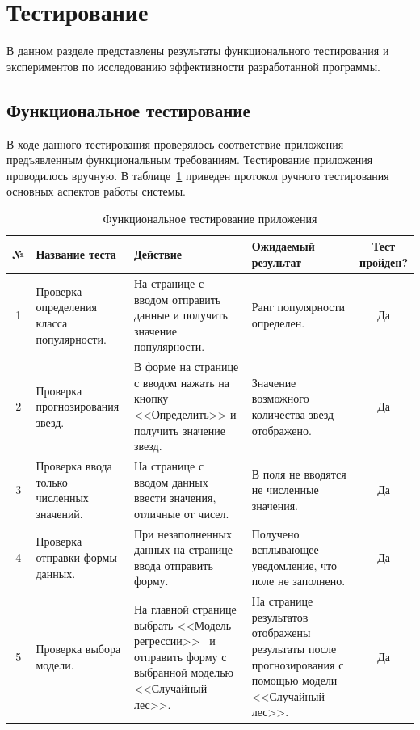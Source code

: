 \newpage
\section{Тестирование}
\label{sec:Testings}
В данном разделе представлены результаты функционального тестирования и экспериментов по исследованию эффективности разработанной программы.
\vspace{1.2em}

\subsection{Функциональное тестирование}

В ходе данного тестирования проверялось соответствие приложения
предъявленным функциональным требованиям. Тестирование приложения
проводилось вручную. В таблице~\ref{tab:тест} приведен протокол ручного тестирования основных аспектов работы системы.

\begin{table}[H]
    \caption{Функциональное тестирование приложения}
    \fontsize{12pt}{1em}\selectfont
    \vspace{1em}
    \begin{tabularx}{\linewidth}{|c|X|X|X|c|}
       \hline
        \textbf{№} & \textbf{Название теста} & \textbf{Действие} & \textbf{Ожидаемый результат} & \makecell{\textbf{Тест} \\ \textbf{пройден?}} \\ \hline
        1 & Проверка определения класса популярности. & На странице с вводом отправить данные и получить значение популярности. & Ранг популярности определен. & Да \\ \hline
        2 & Проверка прогнозирования звезд. & В форме на странице с вводом нажать на кнопку <<Определить>> и получить значение звезд. & Значение возможного количества звезд отображено.  & Да \\ \hline
        3 & Проверка ввода только численных значений. & На странице с вводом данных ввести значения, отличные от чисел. & В поля не вводятся не численные значения. & Да \\ \hline
        4 & Проверка отправки формы данных. & При незаполненных данных на странице ввода отправить форму. & Получено всплывающее уведомление, что поле не заполнено. & Да \\ \hline
        5 & Проверка выбора модели. & На главной странице выбрать <<Модель регрессии>> \ и отправить форму с выбранной моделью <<Случайный лес>>. & На странице результатов отображены результаты после прогнозирования с помощью модели <<Случайный лес>>. & Да \\ \hline
        \end{tabularx} 
    \label{tab:тест}
\end{table}
\vspace{1em}

